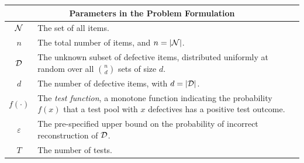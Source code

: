\documentclass[onecolumn,letterpaper]{IEEEtran}
\newcommand{\cN}{{\cal N}}
\newcommand{\cD}{{\cal D}}
\begin{document}
\begin{figure}[omitted: a diagram of this paper's results, not reproduced here]\label{fig:workflow_2_3}\end{figure}
\fi%
\begin{table}
    \centering
    \begin{tabular}{|c|l|}
        \hline
        \multicolumn{2}{|c|}{{\bf Parameters in the Problem Formulation}}
        \\\hline
        $\cN$ & The set of all items.
        \\\hline
        $n$ & The total number of items, and $n = |\cN|$.
        \\\hline
        $\cD$ & The unknown subset of defective items, distributed uniformly at random over all $\binom{n}{d}$ sets of size $d$.
        \\\hline
        $d$ & The number of defective items, with $d = |\cD|$.
        \\\hline
        $f(\cdot)$ & The {\it test function}, a monotone function indicating the probability $f(x)$ that a test pool with $x$ defectives has a positive test outcome.
        \\\hline
        $\varepsilon$ & The pre-specified upper bound on the probability of incorrect reconstruction of $\cD$.
        \\\hline
        $T$ & The number of tests.
        \\\hline
        

\end{tabular}
\end{table}
\end{document}
